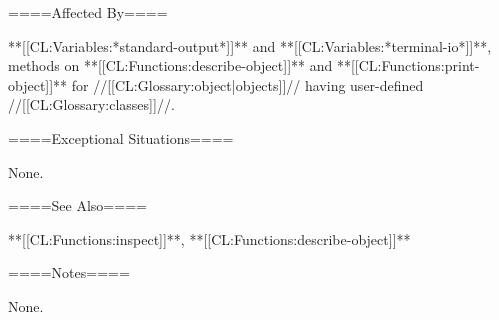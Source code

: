 ====Affected By====

**[[CL:Variables:*standard-output*]]** and **[[CL:Variables:*terminal-io*]]**, methods on **[[CL:Functions:describe-object]]** and **[[CL:Functions:print-object]]** for //[[CL:Glossary:object|objects]]// having user-defined //[[CL:Glossary:classes]]//.

====Exceptional Situations====

None.

====See Also====

**[[CL:Functions:inspect]]**, **[[CL:Functions:describe-object]]**

====Notes====

None.

   
